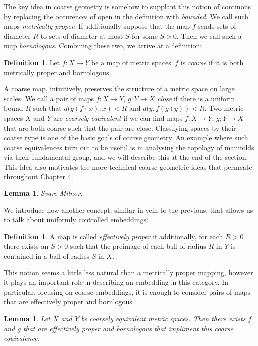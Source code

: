 \documentclass[11pt,]{amsbook}
\theoremstyle{plain}
\newtheorem{lemma}[theorem]{Lemma}%
\theoremstyle{definition}%
\newtheorem{definition}[theorem]{Definition}%
\theoremstyle{remark}%
\begin{document}
The key idea in coarse geometry is somehow to supplant this notion of continous by replacing the occurences of open in the definition with \textit{bounded}. We call such maps \textit{metrically proper}. If additionally suppose that the map $f$ sends sets of diameter $R$ to sets of diameter at most $S$ for some $S>0$. Then we call such a map \textit{bornologous}. Combining these two, we arrive at a definition:

\begin{definition}
Let $f:X \rightarrow Y$ be a map of metric spaces. $f$ is \textit{coarse} if it is both metrically proper and bornologous.
\end{definition}

A coarse map, intuitively, preserves the structure of a metric space on large scales. We call a pair of maps $f:X\rightarrow Y$, $g:Y\rightarrow X$ \textit{close} if there is a uniform bound $R$ such that $d(g(f(x),x)<R$ and $d(y,f(g(y))<R$. Two metric spaces $X$ and $Y$ are \textit{coarsely equivalent} if we can find maps $f:X\rightarrow Y$, $g:Y\rightarrow X$ that are both coarse such that the pair are close.  Classifying spaces by their coarse type is one of the basic goals of coarse geometry. An example where such coarse equivalences turn out to be useful is in analysing the topology of manifolds via their fundamental group, and we will describe this at the end of the section. This idea also motivates the more technical coarse geometric ideas that permeate throughout Chapter 4.

\begin{lemma}
Svarc-Milnor.
\end{lemma}

We introduce now another concept, similar in vein to the previous, that allows us to talk about uniformly controlled embeddings:

\begin{definition}
A map is called \textit{effectively proper} if additionally, for each $R>0$ there exists an $S>0$ such that the preimage of each ball of radius $R$ in $Y$ is contained in a ball of radius $S$ in $X$.
\end{definition}

This notion seems a little less natural than a metrically proper mapping, however it plays an important role in describing an embedding in this category. In particular, focusing on coarse embeddings, it is enough to consider pairs of maps that are effectively proper and bornlogous.

\begin{lemma}
Let $X$ and $Y$ be coarsely equivalent metric spaces. Then there exists $f$ and $g$ that are effectively proper and bornologous that impliment this coarse equivalence.
\end{lemma}
\end{document}
